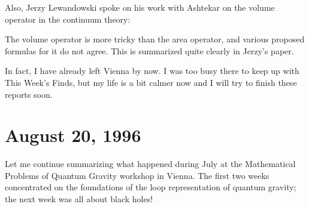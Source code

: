 \documentclass{article}
\renewcommand{\texttt}[1]{%
  \begingroup
  \ttfamily
  \begingroup\lccode`~=`/\lowercase{\endgroup\def~}{/\discretionary{}{}{}}%
  \begingroup\lccode`~=`[\lowercase{\endgroup\def~}{[\discretionary{}{}{}}%
  \begingroup\lccode`~=`.\lowercase{\endgroup\def~}{.\discretionary{}{}{}}%
  \catcode`/=\active\catcode`[=\active\catcode`.=\active
  \scantokens{#1\noexpand}%
  \endgroup
}
\begin{document}
\begin{itemize}

  Also, Jerzy Lewandowski spoke on his work with Ashtekar on the volume
  operator in the continuum theory:


  The volume operator is more tricky than the area operator, and various
  proposed formulas for it do not agree. This is summarized quite
  clearly in Jerzy's paper.

  In fact, I have already left Vienna by now. I was too busy there to
  keep up with This Week's Finds, but my life is a bit calmer now and I
  will try to finish these reports soon.
\end{itemize}
\hypertarget{week87}{%
\section{August 20, 1996}\label{week87}}

Let me continue summarizing what happened during July at the
Mathematical Problems of Quantum Gravity workshop in Vienna. The first
two weeks concentrated on the foundations of the loop representation of
quantum gravity; the next week was all about black holes!
\end{document}
